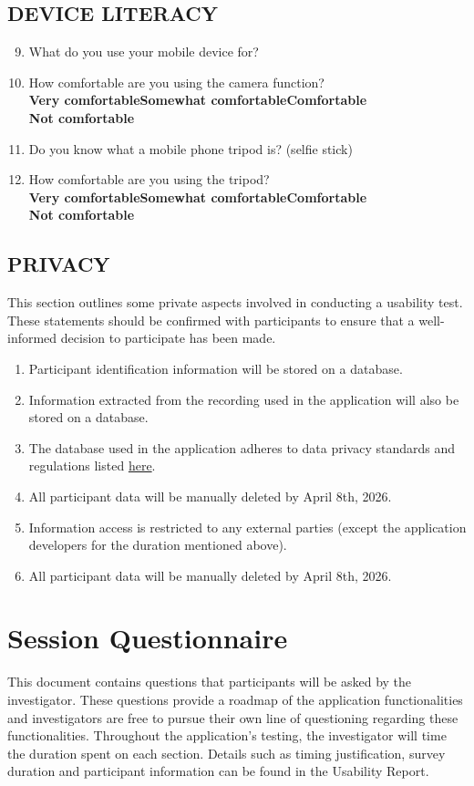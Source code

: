 \documentclass[12pt, titlepage]{article}
\begin{document}
\subsection{\textbf{DEVICE LITERACY}}
\begin{enumerate}
    \setcounter{enumi}{8}
    \item What do you use your mobile device for?
    \item How comfortable are you using the camera function? 
    \\\textbf{Very comfortable\qquad Somewhat comfortable\qquad Comfortable\qquad \\Not comfortable}
    \item Do you know what a mobile phone tripod is? (selfie stick)
    \item How comfortable are you using the tripod?
    \\\textbf{Very comfortable\qquad Somewhat comfortable\qquad Comfortable\qquad \\Not comfortable} 
\end{enumerate}
\subsection{\textbf{PRIVACY}}
This section outlines some private aspects involved in conducting a usability test. These statements 
should be confirmed with participants to ensure that a well-informed decision to participate has been made. 
\begin{enumerate}
    \item Participant identification information will be stored on a database. 
    \item Information extracted from the recording used in the application will also be stored on a database.
    \item The database used in the application adheres to data privacy standards and regulations listed \href{https://firebase.google.com/support/privacy}{here}.
    \item All participant data will be manually deleted by April 8th, 2026. 
    \item Information access is restricted to any external parties (except the application developers for the duration mentioned above).
    \item All participant data will be manually deleted by April 8th, 2026. 
\end{enumerate}
\section{Session Questionnaire} \label{appendix:sessQ}
This document contains questions that participants will be asked by the investigator. These questions provide
a roadmap of the application functionalities and investigators are free to pursue their own line of questioning
regarding these functionalities. Throughout the application's testing, the investigator will time 
the duration spent on each section.  Details such as timing justification, survey duration and participant information 
can be found in the Usability Report. %
\end{document}
